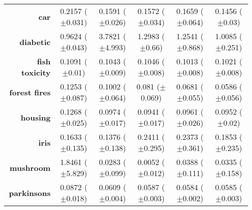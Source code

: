 \begin{table}[htbp]
{\begin{tabular}{r|ccccc}
			\textbf{car}                 & \cellcolor[rgb]{ .973,  .412,  .42}0.2157 ($\pm$0.031)  & \cellcolor[rgb]{ 1,  .922,  .518}0.1591 ($\pm$0.026)    & \cellcolor[rgb]{ .91,  .894,  .51}0.1572 ($\pm$0.034)   & \cellcolor[rgb]{ 1,  .863,  .51}0.1659 ($\pm$0.064)     & \cellcolor[rgb]{ .388,  .745,  .482}0.1456 ($\pm$0.03)  \\
			\textbf{diabetic}            & \cellcolor[rgb]{ .388,  .745,  .482}0.9624 ($\pm$0.043) & \cellcolor[rgb]{ .973,  .412,  .42}3.7821 ($\pm$4.993)  & \cellcolor[rgb]{ 1,  .914,  .518}1.2983 ($\pm$0.66)     & \cellcolor[rgb]{ 1,  .922,  .518}1.2541 ($\pm$0.868)    & \cellcolor[rgb]{ .482,  .773,  .486}1.0085 ($\pm$0.251) \\
			\textbf{fish toxicity}       & \cellcolor[rgb]{ .973,  .412,  .42}0.1091 ($\pm$0.01)   & \cellcolor[rgb]{ 1,  .922,  .518}0.1043 ($\pm$0.009)    & \cellcolor[rgb]{ 1,  .894,  .514}0.1046 ($\pm$0.008)    & \cellcolor[rgb]{ .388,  .745,  .482}0.1013 ($\pm$0.008) & \cellcolor[rgb]{ .549,  .792,  .49}0.1021 ($\pm$0.008)  \\
			\textbf{forest fires}        & \cellcolor[rgb]{ .973,  .412,  .42}0.1253 ($\pm$0.087)  & \cellcolor[rgb]{ .988,  .702,  .478}0.1002 ($\pm$0.064) & \cellcolor[rgb]{ 1,  .922,  .518}0.081 ($\pm$0.069)     & \cellcolor[rgb]{ .647,  .82,  .494}0.0681 ($\pm$0.055)  & \cellcolor[rgb]{ .388,  .745,  .482}0.0586 ($\pm$0.056) \\
			\textbf{housing}             & \cellcolor[rgb]{ .973,  .412,  .42}0.1268 ($\pm$0.025)  & \cellcolor[rgb]{ 1,  .902,  .514}0.0974 ($\pm$0.017)    & \cellcolor[rgb]{ .388,  .745,  .482}0.0941 ($\pm$0.017) & \cellcolor[rgb]{ 1,  .922,  .518}0.0961 ($\pm$0.026)    & \cellcolor[rgb]{ .729,  .843,  .502}0.0952 ($\pm$0.02)  \\
			\textbf{iris}                & \cellcolor[rgb]{ .714,  .839,  .498}0.1633 ($\pm$0.135) & \cellcolor[rgb]{ .388,  .745,  .482}0.1376 ($\pm$0.138) & \cellcolor[rgb]{ .973,  .412,  .42}0.2411 ($\pm$0.295)  & \cellcolor[rgb]{ .976,  .447,  .427}0.2373 ($\pm$0.361) & \cellcolor[rgb]{ 1,  .922,  .518}0.1853 ($\pm$0.235)    \\
			\textbf{mushroom}            & \cellcolor[rgb]{ .973,  .412,  .42}1.8461 ($\pm$5.829)  & \cellcolor[rgb]{ .886,  .886,  .51}0.0283 ($\pm$0.099)  & \cellcolor[rgb]{ .388,  .745,  .482}0.0052 ($\pm$0.012) & \cellcolor[rgb]{ 1,  .922,  .518}0.0388 ($\pm$0.111)    & \cellcolor[rgb]{ 1,  .922,  .518}0.0335 ($\pm$0.158)    \\
			\textbf{parkinsons}          & \cellcolor[rgb]{ .973,  .412,  .42}0.0872 ($\pm$0.018)  & \cellcolor[rgb]{ 1,  .886,  .514}0.0609 ($\pm$0.004)    & \cellcolor[rgb]{ 1,  .922,  .518}0.0587 ($\pm$0.003)    & \cellcolor[rgb]{ .388,  .745,  .482}0.0584 ($\pm$0.002) & \cellcolor[rgb]{ .482,  .769,  .486}0.0585 ($\pm$0.003) \\

\end{tabular}}
\end{table}
